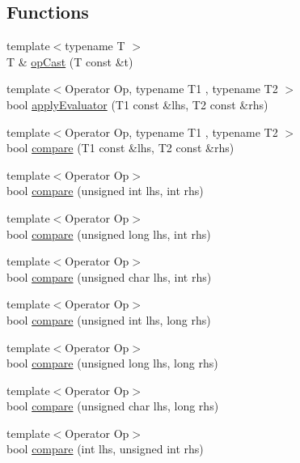 \subsection*{Functions}
\begin{DoxyCompactItemize}
\item 
{\footnotesize template$<$typename T $>$ }\\T \& \hyperlink{namespace_catch_1_1_internal_adde98c1a650e94615e2b37ab0b3734e2}{op\-Cast} (T const \&t)
\item 
{\footnotesize template$<$Operator Op, typename T1 , typename T2 $>$ }\\bool \hyperlink{namespace_catch_1_1_internal_a3849d993997f2b708281ff02e77dfecf}{apply\-Evaluator} (T1 const \&lhs, T2 const \&rhs)
\item 
{\footnotesize template$<$Operator Op, typename T1 , typename T2 $>$ }\\bool \hyperlink{namespace_catch_1_1_internal_a64ae04769c4583b9d4027c792b496c7d}{compare} (T1 const \&lhs, T2 const \&rhs)
\item 
{\footnotesize template$<$Operator Op$>$ }\\bool \hyperlink{namespace_catch_1_1_internal_a171aec1826898b877980a2b15fe5f735}{compare} (unsigned int lhs, int rhs)
\item 
{\footnotesize template$<$Operator Op$>$ }\\bool \hyperlink{namespace_catch_1_1_internal_aa2698c33ec87b16aff5c844165483a7a}{compare} (unsigned long lhs, int rhs)
\item 
{\footnotesize template$<$Operator Op$>$ }\\bool \hyperlink{namespace_catch_1_1_internal_ad68724393ee3d7629001a2997f6134cc}{compare} (unsigned char lhs, int rhs)
\item 
{\footnotesize template$<$Operator Op$>$ }\\bool \hyperlink{namespace_catch_1_1_internal_ac2af7b6757f9bb3539bb78acff5c4649}{compare} (unsigned int lhs, long rhs)
\item 
{\footnotesize template$<$Operator Op$>$ }\\bool \hyperlink{namespace_catch_1_1_internal_ace20062a489a8a7049fe224d62e644a7}{compare} (unsigned long lhs, long rhs)
\item 
{\footnotesize template$<$Operator Op$>$ }\\bool \hyperlink{namespace_catch_1_1_internal_a640e0cce9260a912842bee58db501dc5}{compare} (unsigned char lhs, long rhs)
\item 
{\footnotesize template$<$Operator Op$>$ }\\bool \hyperlink{namespace_catch_1_1_internal_a17c92ed4b6d88a9f8bbcbc52544fe40f}{compare} (int lhs, unsigned int rhs)

\end{DoxyCompactItemize}
